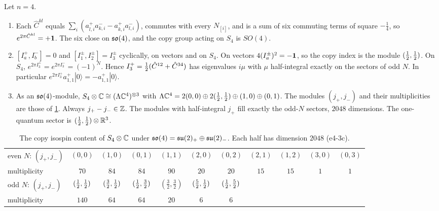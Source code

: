 \begin{theorem}
\label{e4:thm:so4}
Let $n=4$.
\begin{enumerate}[label=(\roman*),leftmargin=2.2em]
\item Each $\hat C^{kl}$ equals $\sum_i(a^+_{l,i}a^-_{k,i}-a^+_{k,i}a^-_{l,i})$, commutes with every $N_{[i]}$, and is a sum of six commuting terms of square
$-\tfrac14$, so $e^{2\pi\hat C^{kl}}=+\mathbf 1$. The six close on $\mathfrak{so}(4)$, and the copy group acting on $S_4$ is $SO(4)$.
\item $[I^+_a,I^-_b]=0$ and $[I^\pm_1,I^\pm_2]=I^\pm_3$ cyclically, on vectors and on $S_4$. On vectors $4(I^\pm_a)^2=-\mathbf 1$, so the copy index is the module
$(\tfrac12,\tfrac12)$. On $S_4$, $e^{2\pi I^+_3}=e^{2\pi I^-_3}=(-1)^N$. Hence $I^+_3=\tfrac12(\hat C^{12}+\hat C^{34})$ has eigenvalues $i\mu$ with $\mu$ half-integral
exactly on the sectors of odd $N$. In particular $e^{2\pi I^+_3}a^+_{1,1}|0\rangle=-a^+_{1,1}|0\rangle$.
\item As an $\mathfrak{so}(4)$-module, $S_4\otimes\mathbb{C}\cong(\Lambda\mathbb{C}^4)^{\otimes3}$ with $\Lambda\mathbb{C}^4=2(0,0)\oplus2(\tfrac12,\tfrac12)\oplus(1,0)\oplus(0,1)$. The modules $(j_+,j_-)$ and their
multiplicities are those of \cref{e4:tab:so4}. Always $j_+-j_-\in\mathbb{Z}$. The modules with half-integral $j_+$ fill exactly the odd-$N$ sectors, $2048$
dimensions. The one-quantum sector is $(\tfrac12,\tfrac12)\otimes\mathbb{R}^3$.
\end{enumerate}
\end{theorem}

\begin{table}[htbp]
\centering
\footnotesize
\begin{tabular}{@{}lcccccccccc@{}}
\toprule
even $N$: $(j_+,j_-)$ & $(0,0)$ & $(1,0)$ & $(0,1)$ & $(1,1)$ & $(2,0)$ & $(0,2)$ & $(2,1)$ & $(1,2)$ & $(3,0)$ & $(0,3)$\\
multiplicity & $70$ & $84$ & $84$ & $90$ & $20$ & $20$ & $15$ & $15$ & $1$ & $1$\\
\midrule
odd $N$: $(j_+,j_-)$ & $(\tfrac12,\tfrac12)$ & $(\tfrac32,\tfrac12)$ & $(\tfrac12,\tfrac32)$ & $(\tfrac32,\tfrac32)$ & $(\tfrac52,\tfrac12)$ & $(\tfrac12,\tfrac52)$ & & & &\\
multiplicity & $140$ & $64$ & $64$ & $20$ & $6$ & $6$ & & & &\\
\bottomrule
\end{tabular}
\caption{The copy isospin content of $S_4\otimes\mathbb{C}$ under $\mathfrak{so}(4)=\mathfrak{su}(2)_+\oplus\mathfrak{su}(2)_-$. Each half has dimension $2048$ (e4-3c).}
\label{e4:tab:so4}
\end{table}

